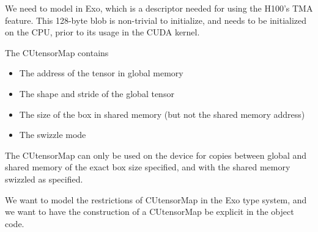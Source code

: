 




We need to model  in Exo, which is a descriptor needed for using the H100's TMA feature.
This 128-byte blob is non-trivial to initialize, and needs to be initialized on the CPU, prior to its usage in the CUDA kernel.

The CUtensorMap contains
\begin{itemize}
  \item The address of the tensor in global memory
  \item The shape and stride of the global tensor
  \item The size of the box in shared memory (but not the shared memory address)
  \item The swizzle mode
\end{itemize}

The CUtensorMap can only be used on the device for copies between global and shared memory of the exact box size specified, and with the shared memory swizzled as specified.

We want to model the restrictions of CUtensorMap in the Exo type system, and we want to have the construction of a CUtensorMap be explicit in the object code.

